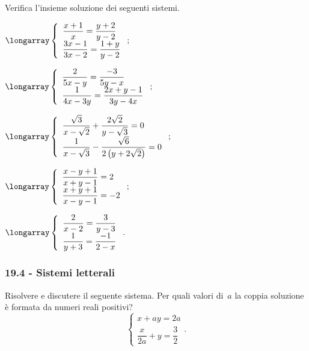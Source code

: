 \begin{esercizio}
 \label{ese:19.51}
Verifica l'insieme soluzione dei seguenti sistemi.
\begin{multicols}{2}
\begin{enumeratea}
\item $\longarray\left\{\begin{array}{l}{\dfrac{x+1}{x}=\dfrac{y+2}{y-2}}\\{\dfrac{3x-1}{3x-2}=\dfrac{1+y}{y-2}}\end{array}\right.;$
\item $\longarray\left\{\begin{array}{l}{\dfrac{2}{5x-y}=\dfrac{-3}{5y-x}}\\{\dfrac{1}{4x-3y}=\dfrac{2x+y-1}{3y-4x}}\end{array}\right.;$
\item $\longarray\left\{\begin{array}{l}{\dfrac{\sqrt{3}}{x-\sqrt{2}}+\dfrac{2\sqrt{2}}{y-\sqrt{3}}=0}\\{\dfrac{1}{x-\sqrt{3}}-\dfrac{\sqrt{6}}{2\left(y+2\sqrt{2}\right)}=0}\end{array}\right.;$
\item $\longarray\left\{\begin{array}{l}{\dfrac{x-y+1}{x+y-1}=2}\\{\dfrac{x+y+1}{x-y-1}=-2}\end{array}\right.;$
\item $\longarray\left\{\begin{array}{l}{\dfrac{2}{x-2}=\dfrac{3}{y-3}}\\{\dfrac{1}{y+3}=\dfrac{-1}{2-x}}\end{array}\right..$
\end{enumeratea}
\end{multicols}
\end{esercizio}
\pagebreak
\subsubsection*{19.4 - Sistemi letterali}

\begin{esercizio}[\Ast]
 \label{ese:19.52}
Risolvere e discutere il seguente sistema. Per quali valori di~$a$ la coppia soluzione è formata da
numeri reali positivi?
\[\left\{\begin{array}{l}{x+ay=2a}\\\dfrac{x}{2a}+y=\dfrac{3}{2}\end{array}\right..\]
\end{esercizio}


